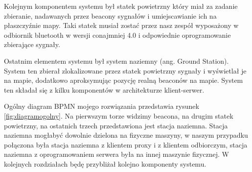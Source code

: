 Kolejnym komponentem systemu był statek powietrzny który miał za zadanie zbieranie, nadawanych przez beacony sygnałów i umiejscawianie ich na płaszczyźnie mapy. Taki statek musiał zostać przez nasz zespół wyposażony w odbiornik bluetooth w wersji conajmniej 4.0 i odpowiednie oprogramowanie zbierające sygnały.

Ostatnim elementem systemu był system naziemny (ang. Ground Station). System ten zbierał zlokalizowane przez statek powietrzny sygnały i wyświetlał je na mapie, dodatkowo aproksymując pozycję realną beaconów na mapie. System ten składał się z kilku komponentów w architekturze klient-serwer.

Ogólny diagram BPMN mojego rozwiązania przedstawia rysunek \ref{fig:diagramogolny}. Na pierwszym torze widzimy beacona, na drugim statek powietrzny, na ostatnich trzech przedstawiona jest stacja naziemna. Stacja naziemna mogłabyć dowolnie dzielona na fizyczne maszyny, w naszym przypadku połączona była stacja naziemna z klientem proxy i z klientem odbiorczym, stacja naziemna z oprogramowaniem serwera była na innej maszynie fizycznej. W kolejnych rozdziałach będę przybliżał kolejno komponenty systemu.

